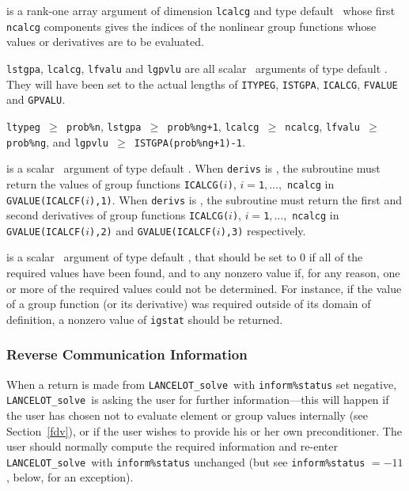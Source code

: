 \documentclass{galahad}
\newcommand{\fullpackagename}{LANC\-E\-LOT}
\newcommand{\solver}{{\tt \fullpackagename\_solve}}
\begin{document}
\begin{description}
 is a rank-one \intentin array argument of
dimension {\tt lcalcg} and type default \integer\,
whose first {\tt ncalcg} components
gives the indices of the nonlinear group functions whose values or
derivatives are to be evaluated.

 \hspace*{-2mm}
{\tt lstgpa},
{\tt lcalcg},
{\tt lfvalu} and
{\tt lgpvlu}
are all scalar \intentin\ arguments of type default \integer.
They will have been set to the actual lengths of
{\tt ITYPEG},
{\tt ISTGPA},
{\tt ICALCG},
{\tt FVALUE} and
{\tt GPVALU}.

\restrictions
{\tt ltypeg $\geq$  prob\%n},
{\tt lstgpa $\geq$ prob\%ng+1},
{\tt lcalcg $\geq$ ncalcg},
{\tt lfvalu $\geq$ prob\%ng}, and
{\tt lgpvlu $\geq$ ISTGPA(prob\%ng+1)-1}.

 is a scalar \intentin\ argument of type default \logical.
When {\tt derivs} is \false, the subroutine must return
the values of group functions
{\tt ICALCG($i$)}, $i = ${\tt 1}$, \ldots ,$ {\tt ncalcg} in
{\tt GVALUE(ICALCF($i$),1)}.
When {\tt derivs} is \true, the subroutine must return
the first and second derivatives of group functions
{\tt ICALCG($i$)}, $i = ${\tt 1}$, \ldots ,$ {\tt ncalcg} in
{\tt GVALUE(ICALCF($i$),2)}
and
{\tt GVALUE(ICALCF($i$),3)}
respectively.

 is a scalar \intentout\ argument of type default \integer,
that should be set to 0 if all of the required values have been found,
and to any nonzero value if, for any reason, one or more of the required
values could not be determined. For instance, if the value of a
group function (or its derivative) was required outside of its domain of
definition, a nonzero value of {\tt igstat} should be returned.

\end{description}

\subsubsection{\label{reverse}Reverse Communication Information}

When a return is made from \solver\
with {\tt inform\%status} set negative,
\solver\
is asking the user for further information---this will happen
if the user has chosen not to evaluate element or group values
internally (see Section~\ref{fdv}), or if the user wishes to provide
his or her own preconditioner. The user
should normally compute the required information and re-enter \solver\
with {\tt inform\%status} unchanged
(but see {\tt inform\%status} $= -11$, below, for an exception).
\end{document}
